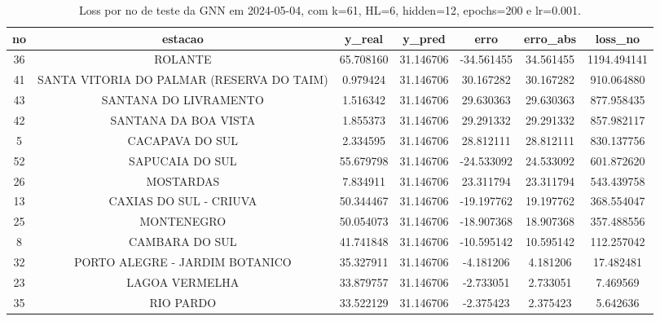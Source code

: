 \begin{table}[h]
\centering
\caption{Loss por no de teste da GNN em 2024-05-04, com k=61, HL=6, hidden=12, epochs=200 e lr=0.001.}
\label{tab:gnn_loss_k61_hl6_h12_e200_d20240504}
\begin{tabular}{ccccccc}
\toprule
no & estacao & y\_real & y\_pred & erro & erro\_abs & loss\_no \\
\midrule
36 & ROLANTE & 65.708160 & 31.146706 & -34.561455 & 34.561455 & 1194.494141 \\
41 & SANTA VITORIA DO PALMAR (RESERVA DO TAIM) & 0.979424 & 31.146706 & 30.167282 & 30.167282 & 910.064880 \\
43 & SANTANA DO LIVRAMENTO & 1.516342 & 31.146706 & 29.630363 & 29.630363 & 877.958435 \\
42 & SANTANA DA BOA VISTA & 1.855373 & 31.146706 & 29.291332 & 29.291332 & 857.982117 \\
5 & CACAPAVA DO SUL & 2.334595 & 31.146706 & 28.812111 & 28.812111 & 830.137756 \\
52 & SAPUCAIA DO SUL & 55.679798 & 31.146706 & -24.533092 & 24.533092 & 601.872620 \\
26 & MOSTARDAS & 7.834911 & 31.146706 & 23.311794 & 23.311794 & 543.439758 \\
13 & CAXIAS DO SUL - CRIUVA & 50.344467 & 31.146706 & -19.197762 & 19.197762 & 368.554047 \\
25 & MONTENEGRO & 50.054073 & 31.146706 & -18.907368 & 18.907368 & 357.488556 \\
8 & CAMBARA DO SUL & 41.741848 & 31.146706 & -10.595142 & 10.595142 & 112.257042 \\
32 & PORTO ALEGRE - JARDIM BOTANICO & 35.327911 & 31.146706 & -4.181206 & 4.181206 & 17.482481 \\
23 & LAGOA VERMELHA & 33.879757 & 31.146706 & -2.733051 & 2.733051 & 7.469569 \\
35 & RIO PARDO & 33.522129 & 31.146706 & -2.375423 & 2.375423 & 5.642636 \\
\bottomrule
\end{tabular}
\end{table}
